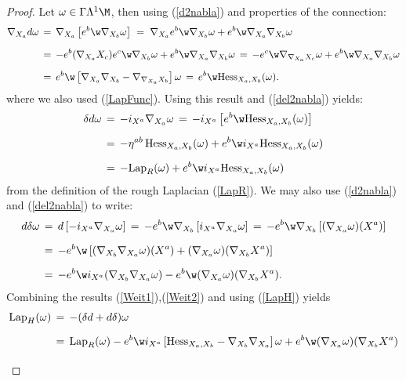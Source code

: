 \documentclass[sections]{tjwNOTES}
\newcommand{\LapH}{\text{Lap}_{H}}
\newcommand{\LapR}{\text{Lap}_{R}}
\newcommand{\Hess}{\text{Hess}}
\begin{document}
\begin{proof}
	Let $\omega\in\Gamma\Lambda^{1}\M$, then using (\ref{d2nabla}) and properties of the connection:
	\begin{align*}
		\nabla_{X_{a}}d\omega &\,=\, \nabla_{X_{a}}\left[ e^{b} \w \nabla_{X_{b}}\omega\right] \;=\;  \nabla_{X_{a}}e^{b} \w \nabla_{X_{b}}\omega + e^{b} \w  \nabla_{X_{a}}\nabla_{X_{b}}\omega \\[0.2cm]
		&\,=\, - e^{b}(\nabla_{X_{a}}X_{c})e^{c} \w \nabla_{X_{b}}\omega + e^{b} \w  \nabla_{X_{a}}\nabla_{X_{b}}\omega
		\,=\, - e^{c} \w \nabla_{\nabla_{X_{a}}X_{c}}\omega + e^{b} \w  \nabla_{X_{a}}\nabla_{X_{b}}\omega \\[0.2cm]
			&\,=\, e^{b} \w \left[ \nabla_{X_{a}}\nabla_{X_{b}}- \nabla_{\nabla_{X_{a}}X_{b}} \right]\omega \,=\, e^{b} \w \Hess_{X_{a},X_{b}}(\omega).
	\end{align*}
	where we also used (\ref{LapFunc}). Using this result and (\ref{del2nabla}) yields:
	\begin{align}
		\nonumber \delta d\omega &\,=\, -i_{X^{a}}\nabla_{X_{a}}\omega \,=\,  -i_{X^{a}}\left[e^{b} \w \Hess_{X_{a},X_{b}}(\omega)\right] \\[0.2cm]
			&\,=\, -\eta^{ab}\,\Hess_{X_{a},X_{b}}(\omega) + e^{b} \w i_{X^{a}}\Hess_{X_{a},X_{b}}(\omega) \\[0.2cm]
		\label{Weit1} &\,=\, -\LapR(\omega) + e^{b} \w i_{X^{a}}\Hess_{X_{a},X_{b}}(\omega)
	\end{align}
	from the definition of the rough Laplacian (\ref{LapR}). We may also use (\ref{d2nabla}) and (\ref{del2nabla}) to write:
	\begin{align}
		\nonumber d\delta \omega &\,=\, d\left[ -i_{X^{a}}\nabla_{X_{a}}\omega \right] \,=\, -e^{b} \w \nabla_{X_{b}}\left[ i_{X^{a}}\nabla_{X_{a}}\omega \right] \,=\, -e^{b} \w \nabla_{X_{b}}\left[ (\nabla_{X_{a}}\omega)(X^{a}) \right] \\[0.2cm]
		\nonumber &\,=\, -e^{b} \w \left[ (\nabla_{X_{b}}\nabla_{X_{a}}\omega)(X^{a}) + (\nabla_{X_{a}}\omega)(\nabla_{X_{b}}X^{a}) \right] \\[0.2cm]
		\label{Weit2} &\,=\, -e^{b} \w i_{X^{a}}(\nabla_{X_{b}}\nabla_{X_{a}}\omega) - e^{b} \w  (\nabla_{X_{a}}\omega)(\nabla_{X_{b}}X^{a}) .
	\end{align}
	Combining the results (\ref{Weit1}),(\ref{Weit2}) and using (\ref{LapH}) yields
	\begin{align}
		\nonumber \LapH(\omega) &\,=\, -(\delta d + d\delta)\omega \\[0.2cm]
		\nonumber  &\,=\, \LapR(\omega) - e^{b} \w i_{X^{a}}\left[\Hess_{X_{a},X_{b}} - \nabla_{X_{b}}\nabla_{X_{a}} \right]\omega	 + e^{b} \w  (\nabla_{X_{a}}\omega)(\nabla_{X_{b}}X^{a}) \\[0.2cm]

\end{align}
\end{proof}
\end{document}
